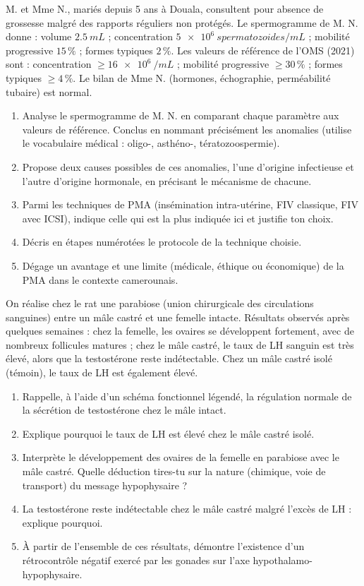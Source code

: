 \documentclass[11pt]{article}
\begin{document}
\begin{exercice}
M. et Mme N., mariés depuis 5 ans à Douala, consultent pour absence de grossesse malgré des rapports réguliers non protégés. Le spermogramme de M. N. donne : volume $\SI{2,5}{mL}$ ; concentration $\SI{5e6}{spermatozoides/mL}$ ; mobilité progressive $15\,\%$ ; formes typiques $2\,\%$. Les valeurs de référence de l'OMS (2021) sont : concentration $\geq \SI{16e6}{/mL}$ ; mobilité progressive $\geq 30\,\%$ ; formes typiques $\geq 4\,\%$. Le bilan de Mme N. (hormones, échographie, perméabilité tubaire) est normal.
\begin{enumerate}
\item Analyse le spermogramme de M. N. en comparant chaque paramètre aux valeurs de référence. Conclus en nommant précisément les anomalies (utilise le vocabulaire médical : oligo-, asthéno-, tératozoospermie).
\item Propose deux causes possibles de ces anomalies, l'une d'origine infectieuse et l'autre d'origine hormonale, en précisant le mécanisme de chacune.
\item Parmi les techniques de PMA (insémination intra-utérine, FIV classique, FIV avec ICSI), indique celle qui est la plus indiquée ici et justifie ton choix.
\item Décris en étapes numérotées le protocole de la technique choisie.
\item Dégage un avantage et une limite (médicale, éthique ou économique) de la PMA dans le contexte camerounais.
\end{enumerate}
\end{exercice}

\begin{exercice}
On réalise chez le rat une parabiose (union chirurgicale des circulations sanguines) entre un mâle castré et une femelle intacte. Résultats observés après quelques semaines : chez la femelle, les ovaires se développent fortement, avec de nombreux follicules matures ; chez le mâle castré, le taux de LH sanguin est très élevé, alors que la testostérone reste indétectable. Chez un mâle castré isolé (témoin), le taux de LH est également élevé.
\begin{enumerate}
\item Rappelle, à l'aide d'un schéma fonctionnel légendé, la régulation normale de la sécrétion de testostérone chez le mâle intact.
\item Explique pourquoi le taux de LH est élevé chez le mâle castré isolé.
\item Interprète le développement des ovaires de la femelle en parabiose avec le mâle castré. Quelle déduction tires-tu sur la nature (chimique, voie de transport) du message hypophysaire ?
\item La testostérone reste indétectable chez le mâle castré malgré l'excès de LH : explique pourquoi.
\item À partir de l'ensemble de ces résultats, démontre l'existence d'un rétrocontrôle négatif exercé par les gonades sur l'axe hypothalamo-hypophysaire.
\end{enumerate}
\end{exercice}
\end{document}
